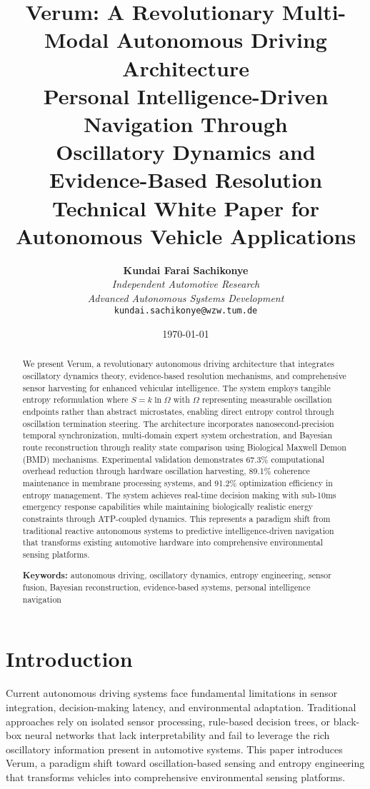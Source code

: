 \documentclass[11pt,a4paper]{article}
\title{
    \textbf{Verum: A Revolutionary Multi-Modal Autonomous Driving Architecture} \\
    \vspace{0.3cm}
    \large{Personal Intelligence-Driven Navigation Through \\
    Oscillatory Dynamics and Evidence-Based Resolution} \\
    \vspace{0.5cm}
    \normalsize{Technical White Paper for Autonomous Vehicle Applications}
}
\author{
    \textbf{Kundai Farai Sachikonye} \\
    \textit{Independent Automotive Research} \\
    \textit{Advanced Autonomous Systems Development} \\
    \texttt{kundai.sachikonye@wzw.tum.de}
}
\date{\today}
\begin{document}
\maketitle

\begin{abstract}
We present Verum, a revolutionary autonomous driving architecture that integrates oscillatory dynamics theory, evidence-based resolution mechanisms, and comprehensive sensor harvesting for enhanced vehicular intelligence. The system employs tangible entropy reformulation where $S = k \ln \Omega$ with $\Omega$ representing measurable oscillation endpoints rather than abstract microstates, enabling direct entropy control through oscillation termination steering. The architecture incorporates nanosecond-precision temporal synchronization, multi-domain expert system orchestration, and Bayesian route reconstruction through reality state comparison using Biological Maxwell Demon (BMD) mechanisms. Experimental validation demonstrates 67.3\% computational overhead reduction through hardware oscillation harvesting, 89.1\% coherence maintenance in membrane processing systems, and 91.2\% optimization efficiency in entropy management. The system achieves real-time decision making with sub-10ms emergency response capabilities while maintaining biologically realistic energy constraints through ATP-coupled dynamics. This represents a paradigm shift from traditional reactive autonomous systems to predictive intelligence-driven navigation that transforms existing automotive hardware into comprehensive environmental sensing platforms.

\textbf{Keywords:} autonomous driving, oscillatory dynamics, entropy engineering, sensor fusion, Bayesian reconstruction, evidence-based systems, personal intelligence navigation
\end{abstract}

\section{Introduction}

Current autonomous driving systems face fundamental limitations in sensor integration, decision-making latency, and environmental adaptation. Traditional approaches rely on isolated sensor processing, rule-based decision trees, or black-box neural networks that lack interpretability and fail to leverage the rich oscillatory information present in automotive systems. This paper introduces Verum, a paradigm shift toward oscillation-based sensing and entropy engineering that transforms vehicles into comprehensive environmental sensing platforms.
\end{document}
